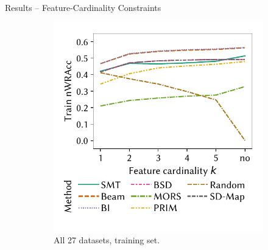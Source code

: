 \documentclass[en, navbaroff, handout]{sdqbeamer}
\begin{document}
\begin{frame}[t]{Results -- Feature-Cardinality Constraints}
	\begin{figure}
		\centering
		\begin{subfigure}[t]{0.32\textwidth}
			\centering
			\includegraphics[width=\textwidth, trim=10 25 10 10, clip]{plots/csd-cardinality-train-nwracc-all-datasets.pdf}
			\caption{All 27 datasets, training set.}
			\label{fig:csd:cardinality-train-nwracc-all-datasets}
		\end{subfigure}
		\pause
		\hfill
		\begin{subfigure}[t]{0.32\textwidth}
			\centering

\end{subfigure}
\end{figure}
\end{frame}
\end{document}
